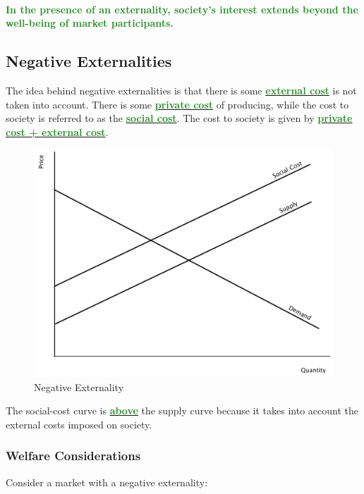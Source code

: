 \documentclass[11pt]{article}\usepackage[]{graphicx}\usepackage[]{color}
\theoremstyle{definition}
\newcommand{\ddp}[1]{{\textbf{\textcolor{ForestGreen}{#1}}}}
\newcommand{\dd}[1]{{\underline{\textbf{\textcolor{ForestGreen}{#1}}}}}
\begin{document}
	\ddp{\\ In the presence of an externality, society's interest extends beyond the well-being of market participants.}
	
	\subsection{Negative Externalities}
	
	The idea behind negative externalities is that there is some \dd{external cost} is not taken into account. There is some \dd{private cost} of producing, while the cost to society is referred to as the \dd{social cost}. The cost to society is given by \dd{private cost + external cost}.
	
		\begin{figure}[H]
			\centering
			\includegraphics[scale=.4]{plot50.pdf}
			\caption{Negative Externality}
		\end{figure}
	
	The social-cost curve is \dd{above} the supply curve because it takes into account the external costs imposed on society.
	
	\subsubsection*{Welfare Considerations}
	
	
	Consider a market with a negative externality:
	
\end{document}
